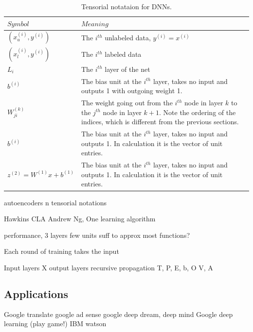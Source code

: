 \documentclass[12pt]{article}  %
\begin{document}
\begin{table}[h]
\begin{center}
\begin{tabular}{ | l | p{10cm} | }

\hline
$Symbol$ & $Meaning$ \\
\hline \hline
$(x^{(i)}_u, y^{(i)})$ & The $i^{th}$ unlabeled data, $y^{(i)} = x^{(i)}$ \\
\hline
$(x^{(i)}_l, y^{(i)})$ & The $i^{th}$ labeled data \\
\hline
$L_i$ & The $i^{th}$ layer of the net \\
\hline
$b^(i)$ & The bias unit at the $i^{th}$ layer, takes no input and outputs 1 with outgoing weight 1. \\
\hline
$W^(k)_{ji}$ & The weight going out from the $i^{th}$ node in layer $k$ to the $j^{th}$ node in layer $k+1$. Note the ordering of the indices, which is different from the previous sections. \\
\hline
$b^(i)$ & The bias unit at the $i^{th}$ layer, takes no input and outputs 1. In calculation it is the vector of unit entries. \\
\hline
$z^{(2)} = W^{(1)} x + b^{(1)}$ & The bias unit at the $i^{th}$ layer, takes no input and outputs 1. In calculation it is the vector of unit entries. \\
\hline
\end{tabular}
\caption{Tensorial notataion for DNNs.}
\label{tensor-note}
\end{center}
\end{table}


autoencoders n tensorial notations


Hawkins
CLA
Andrew Ng, One learning algorithm






performance, 3 layers few units suff to approx most functions?

Each round of training takes the input 


Input layers X
output layers
recursive propagation
T, P, E, b, O
V, A



\subsection{Applications}
Google translate
google ad sense
google deep dream, deep mind
Google deep learning (play game!)
IBM watson
\end{document}
